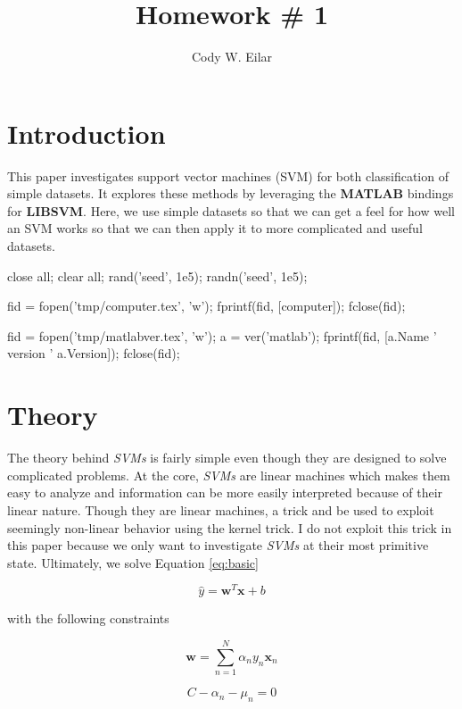 \documentclass[11pt, twoside]{article}   	%
\title{Homework \# 1}
\author{Cody W. Eilar}
\newenvironment{matlab}{\comment}{\endcomment}
\begin{document}
\maketitle
\section{Introduction} 
This paper investigates support vector machines (SVM) for both classification
 of simple datasets. It explores these methods by leveraging
the \textbf{MATLAB} bindings for \textbf{LIBSVM}. Here, we use simple datasets
so that we can get a feel for how well an SVM works so that we can then 
apply it to more complicated and useful datasets. 

\begin{matlab}
close all; 
clear all;
rand('seed', 1e5);
randn('seed', 1e5);

fid = fopen('tmp/computer.tex', 'w'); 
fprintf(fid, [computer]); 
fclose(fid); 

fid = fopen('tmp/matlabver.tex', 'w'); 
a = ver('matlab'); 
fprintf(fid, [a.Name ' version ' a.Version]); 
fclose(fid); 
\end{matlab}

\section{Theory}
The theory behind \textit{SVMs} is fairly simple even though they are designed
to solve complicated problems. At the core, \textit{SVMs} are linear machines
which makes them easy to analyze and information can be more easily 
interpreted because of their linear nature. Though they are linear machines,
a trick and be used to exploit seemingly non-linear behavior using the kernel trick. 
I do not exploit this trick in this paper because we only want to investigate
\textit{SVMs} at their most primitive state. Ultimately, we solve Equation \ref{eq:basic} 

\begin{equation}
\hat{y}= \mathbf{w}^T\mathbf{x} + b 
\label{eq:basic}
\end{equation}

with the following constraints

\begin{equation}
\mathbf{w} = \sum\limits_{n=1}^{N} \alpha_n y_n\mathbf{x}_n
\label{eq:c1}
\end{equation}

\begin{equation}
C - \alpha_n -\mu_n = 0
\label{eq:c2}
\end{equation}
\end{document}

